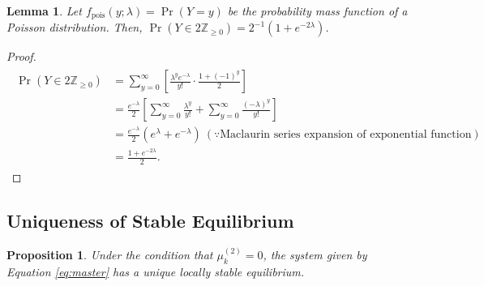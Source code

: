 \documentclass[11pt, class=article, crop=false]{standalone}
\newtheorem{proposition}{Proposition}[subsection]
\newtheorem{lemma}{Lemma}[subsection]
\theoremstyle{definition}
\begin{document}
\begin{lemma}
\label{lemma-pois}
Let $f_{\text{pois}}(y; \lambda) = \Pr(Y = y)$ be the probability mass function of a Poisson distribution.
Then, $\Pr(Y \in 2\mathbb{Z}_{\ge 0}) = 2^{-1}(1 + e^{- 2 \lambda})$.
\end{lemma}
\begin{proof}
\begin{align}
    \begin{split}
        \Pr(Y \in 2\mathbb{Z}_{\ge 0}) 
        &= \sum_{y = 0}^{\infty} \left[ \frac{\lambda^{y} e^{-\lambda}}{y!} \cdot \frac{1 + (-1)^{y}}{2} \right]\\
        &= \frac{e^{-\lambda}}{2} \left[ \sum_{y = 0}^{\infty} \frac{\lambda^{y}}{y!} + \sum_{y = 0}^{\infty} \frac{(-\lambda)^{y}}{y!}\right]\\
        &= \frac{e^{-\lambda}}{2} (e^{\lambda} + e^{-\lambda}) ~ (\because \text{Maclaurin series expansion of exponential function})\\
        &= \frac{1 + e^{- 2 \lambda}}{2}.
    \end{split}
\end{align}
\end{proof}

\newpage

\subsection{Uniqueness of Stable Equilibrium}
 
\begin{proposition}
Under the condition that $\mu_k^{(2)} = 0$, the system given by Equation \ref{eq:master} has a unique locally stable equilibrium.
\end{proposition}
\end{document}
